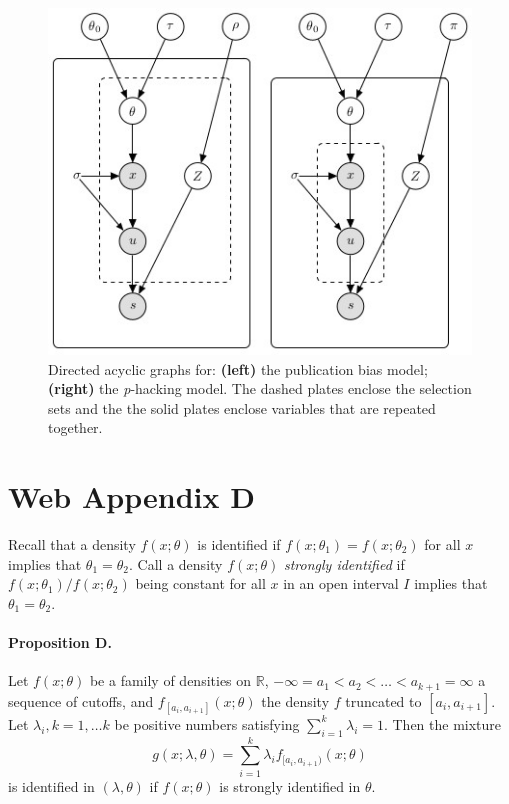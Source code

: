 \documentclass[english]{article}
\begin{document}
\begin{figure}
\begin{center}
\includegraphics{plots/figure_B.jpg}
\end{center}
\caption{\label{fig:Plate notation, publication bias and p-hacking} Directed acyclic graphs for: {\bf (left)}
the publication bias model; {\bf (right)} the \textit{p}-hacking model. The dashed plates enclose the selection sets and the the solid plates enclose variables that are repeated together.}
\end{figure}




\section*{Web Appendix D}

Recall that a density $f(x;\theta)$ is identified if $f(x;\theta_{1})=f(x;\theta_{2})$
for all $x$ implies that $\theta_{1}=\theta_{2}.$ Call a density
$f(x;\theta)$ \textit{strongly identified} if $f(x;\theta_{1})/f(x;\theta_{2})$
being constant for all $x$ in an open interval $I$ implies that
$\theta_{1}=\theta_{2}$.
\paragraph{Proposition D.}\label{prop:identified}

Let $f(x;\theta)$ be a family of densities on $\mathbb{R}$, $-\infty=a_{1}<a_{2}<\ldots<a_{k+1}=\infty$
a sequence of cutoffs, and $f_{[a_{i},a_{i+1}]}(x;\theta)$ the density
$f$ truncated to $[a_{i},a_{i+1}]$. Let $\lambda_{i},k=1,\ldots k$
be positive numbers satisfying $\sum_{i=1}^{k}\lambda_{i}=1$. Then
the mixture
\[
g(x;\lambda,\theta)=\sum_{i=1}^{k}\lambda_{i}f_{[a_{i},a_{i+1})}(x;\theta)
\]
is identified in $(\lambda,\theta)$ if $f(x;\theta)$ is strongly
identified in $\theta$.
\end{document}
